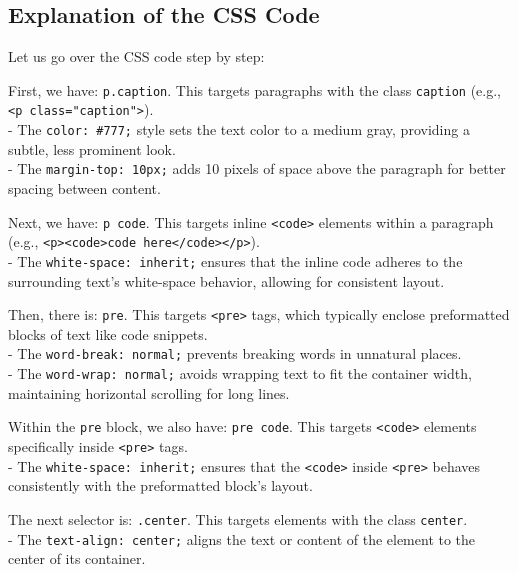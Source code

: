 \documentclass[
]{book}
\theoremstyle{definition}
\theoremstyle{definition}
\theoremstyle{definition}
\theoremstyle{definition}
\theoremstyle{remark}
\begin{document}
\subsection{Explanation of the CSS Code}\label{explanation-of-the-css-code}

Let us go over the CSS code step by step:

First, we have: \texttt{p.caption}. This targets paragraphs with the class \texttt{caption} (e.g., \texttt{\textless{}p\ class="caption"\textgreater{}}).\\
- The \texttt{color:\ \#777;} style sets the text color to a medium gray, providing a subtle, less prominent look.\\
- The \texttt{margin-top:\ 10px;} adds 10 pixels of space above the paragraph for better spacing between content.

Next, we have: \texttt{p\ code}. This targets inline \texttt{\textless{}code\textgreater{}} elements within a paragraph (e.g., \texttt{\textless{}p\textgreater{}\textless{}code\textgreater{}code\ here\textless{}/code\textgreater{}\textless{}/p\textgreater{}}).\\
- The \texttt{white-space:\ inherit;} ensures that the inline code adheres to the surrounding text's white-space behavior, allowing for consistent layout.

Then, there is: \texttt{pre}. This targets \texttt{\textless{}pre\textgreater{}} tags, which typically enclose preformatted blocks of text like code snippets.\\
- The \texttt{word-break:\ normal;} prevents breaking words in unnatural places.\\
- The \texttt{word-wrap:\ normal;} avoids wrapping text to fit the container width, maintaining horizontal scrolling for long lines.

Within the \texttt{pre} block, we also have: \texttt{pre\ code}. This targets \texttt{\textless{}code\textgreater{}} elements specifically inside \texttt{\textless{}pre\textgreater{}} tags.\\
- The \texttt{white-space:\ inherit;} ensures that the \texttt{\textless{}code\textgreater{}} inside \texttt{\textless{}pre\textgreater{}} behaves consistently with the preformatted block's layout.

The next selector is: \texttt{.center}. This targets elements with the class \texttt{center}.\\
- The \texttt{text-align:\ center;} aligns the text or content of the element to the center of its container.
\end{document}
